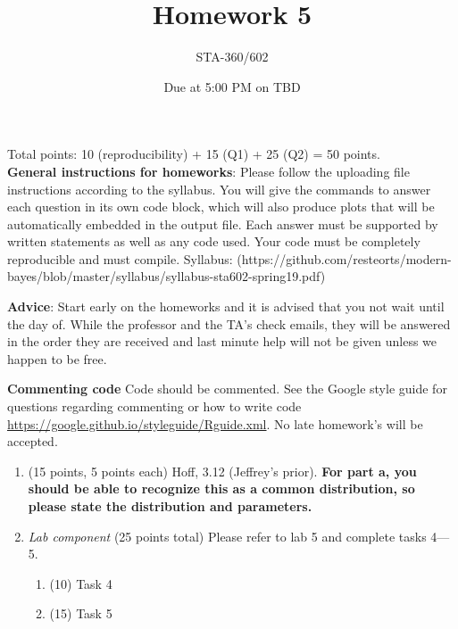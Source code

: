 \documentclass{article}
\begin{document}
\title{Homework 5}
\author{STA-360/602}
\date{Due at 5:00 PM on TBD}

\maketitle

Total points: 10 (reproducibility) + 15 (Q1) + 25 (Q2) = 50 points. \\

\textbf{General instructions for homeworks}: Please follow the uploading file instructions according to the syllabus. You will give the commands to answer each question in its own code block, which will also produce plots that will be automatically embedded in the output file. Each answer must be supported by written statements as well as any code used. Your code must be completely reproducible and must compile. Syllabus: (https://github.com/resteorts/modern-bayes/blob/master/syllabus/syllabus-sta602-spring19.pdf)

\textbf{Advice}: Start early on the homeworks and it is advised that you not wait until the day of. While the professor and the TA's check emails, they will be answered in the order they are received and last minute help will not be given unless we happen to be free.  

\textbf{Commenting code}
Code should be commented. See the Google style guide for questions regarding commenting or how to write 
code \url{https://google.github.io/styleguide/Rguide.xml}. No late homework's will be accepted.

\begin{enumerate}
\item (15 points, 5 points each) Hoff, 3.12 (Jeffrey's prior). 
\textbf{For part a, you should be able to recognize this as a common distribution, so please state the distribution and parameters.}


\item {\em Lab component} 
  (25 points total) Please refer to lab 5 and complete tasks 4---5. 
  \begin{enumerate}
  \item (10) Task 4
  \item (15) Task 5
  \end{enumerate}
  
\end{enumerate}
\end{document}
